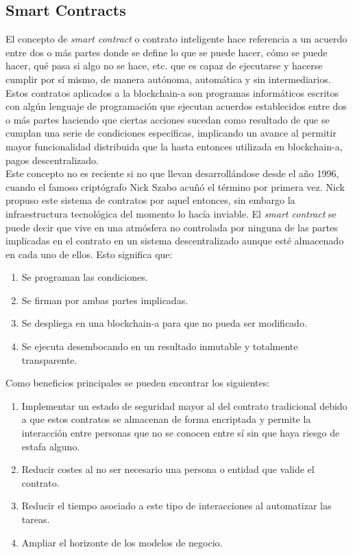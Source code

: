 \documentclass[12pt,a4paper, twoside]{report}
\begin{document}
	\subsection{Smart Contracts}
	
	El concepto de \textit{smart contract} o contrato inteligente hace referencia a un acuerdo entre dos o más partes donde se define lo que se puede hacer, cómo se puede hacer, qué pasa si algo no se hace, etc. que es capaz de ejecutarse y hacerse cumplir por sí mismo, de manera autónoma, automática y sin intermediarios. Estos contratos aplicados a la \gls{blockchain-a} son programas informáticos escritos con algún lenguaje de programación que ejecutan acuerdos establecidos entre dos o más partes haciendo que ciertas acciones sucedan como resultado de que se cumplan una serie de condiciones específicas, implicando un avance al permitir mayor funcionalidad distribuida que la hasta entonces utilizada en \gls{blockchain-a}, pagos descentralizado. \\
	
	Este concepto no es reciente si no que llevan desarrollándose desde el año 1996, cuando el famoso criptógrafo Nick Szabo acuñó el término por primera vez. Nick propuso este sistema de contratos por aquel entonces, sin embargo la infraestructura tecnológica del momento lo hacía inviable. El \textit{smart contract} se puede decir que vive en una atmósfera no controlada por ninguna de las partes implicadas en el contrato en un sistema descentralizado aunque esté almacenado en cada uno de ellos. Esto significa que:
	
	\begin{enumerate}
		\item Se programan las condiciones.
		\item Se firman por ambas partes implicadas.
		\item Se despliega en una \gls{blockchain-a} para que no pueda ser modificado.
		\item Se ejecuta desembocando en un resultado inmutable y totalmente transparente.
	\end{enumerate}

	Como beneficios principales se pueden encontrar los siguientes:
	
	\begin{enumerate}
		\item Implementar un estado de seguridad mayor al del contrato tradicional debido a que estos contratos se almacenan de forma encriptada y permite la interacción entre personas que no se conocen entre sí sin que haya riesgo de estafa alguno.
		\item Reducir costes al no ser necesario una persona o entidad que valide el contrato.		
		\item Reducir el tiempo asociado a este tipo de interacciones al automatizar las tareas.
		\item Ampliar el horizonte de los modelos de negocio.
	\end{enumerate}
\end{document}
